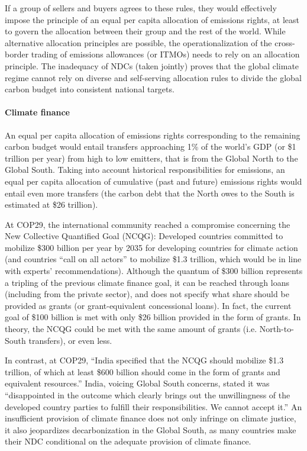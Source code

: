 \documentclass[12pt,english]{article}
\begin{document}
If a group of sellers and buyers agrees to these rules, they would effectively impose the principle of an equal per capita allocation of emissions rights, at least to govern the allocation between their group and the rest of the world. While alternative allocation principles are possible, the operationalization of the cross-border trading of emissions allowances (or ITMOs) needs to rely on an allocation principle. The inadequacy of NDCs (taken jointly) proves that the global climate regime cannot rely on diverse and self-serving allocation rules to divide the global carbon budget into consistent national targets. 


\paragraph{Climate finance}

An equal per capita allocation of emissions rights corresponding to the remaining carbon budget would entail transfers approaching 1\% of the world's GDP (or \$1 trillion per year) from high to low emitters, that is from the Global North to the Global South. Taking into account historical responsibilities for emissions, an equal per capita allocation of cumulative (past and future) emissions rights would entail even more transfers (the carbon debt that the North owes to the South is estimated at \$26 trillion\cite{fabre_global_2024}). 

At COP29, the international community reached a compromise concerning the New Collective Quantified Goal (NCQG): Developed countries committed to mobilize \$300 billion per year by 2035 for developing countries for climate action (and countries ``call on all actors'' to mobilize \$1.3 trillion, which would be in line with experts' recommendations\cite{unfccc_new_2024,songwe_raising_2024}). Although the quantum of \$300 billion represents a tripling of the previous climate finance goal, it can be reached through loans (including from the private sector), and does not specify what share should be provided as grants (or grant-equivalent concessional loans). In fact, the current goal of \$100 billion is met with only \$26 billion provided in the form of grants. In theory, the NCQG could be met with the same amount of grants (i.e. North-to-South transfers), or even less. 

In contrast, at COP29, ``India specified that the NCQG should mobilize \$1.3 trillion, of which at least \$600 billion should come in the form of grants and equivalent resources.''\cite{earth_negotiations_bulletin_daily_2024} India, voicing Global South concerns, stated it was ``disappointed in the outcome which clearly brings out the unwillingness of the developed country parties to fulfill their responsibilities. We cannot accept it.'' An insufficient provision of climate finance does not only infringe on climate justice, it also jeopardizes decarbonization in the Global South, as many countries make their NDC conditional on the adequate provision of climate finance. 
\end{document}
